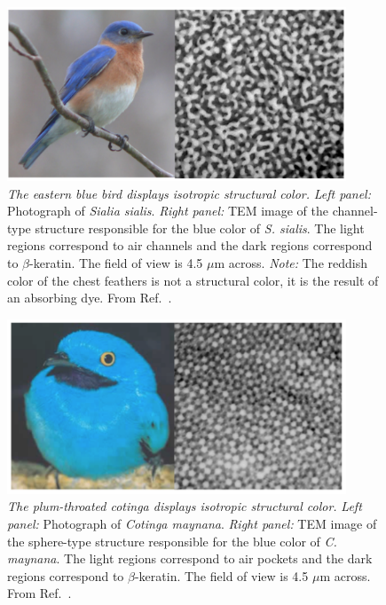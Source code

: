\begin{figure}[htbp]
\centering
\includegraphics[width=0.9\textwidth]{figures/SialiaPic.pdf}
\caption{\label{fig:sialia} \emph{The eastern blue bird displays isotropic structural color.}
	\emph{Left panel:} Photograph of \emph{Sialia sialis}.
	\emph{Right panel:} TEM image of the channel-type structure responsible for the blue color of \emph{S. sialis}.
	The light regions correspond to air channels and the dark regions correspond to $\beta$-keratin.
	The field of view is 4.5 $\mu$m across.
	\emph{Note:} The reddish color of the chest feathers is not a structural color, it is the result of an absorbing dye.
	From Ref.~\cite{Dufresne:2009p6342}.}
\end{figure}

\begin{figure}[htbp]
\centering
\includegraphics[width=0.9\textwidth]{figures/CotingaPic.pdf}
\caption{\label{fig:cotinga} \emph{The plum-throated cotinga displays isotropic structural color.}
	\emph{Left panel:} Photograph of \emph{Cotinga maynana}.
	\emph{Right panel:} TEM image of the sphere-type structure responsible for the blue color of \emph{C. maynana}.
	The light regions correspond to air pockets and the dark regions correspond to $\beta$-keratin.
	The field of view is 4.5 $\mu$m across.
	From Ref.~\cite{Dufresne:2009p6342}.}
\end{figure}

